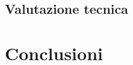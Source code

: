 \documentclass[Lau,binding=0.6cm]{sapthesis}
\begin{document}
\section{Valutazione tecnica}

\chapter{Conclusioni}

\backmatter
\end{document}
